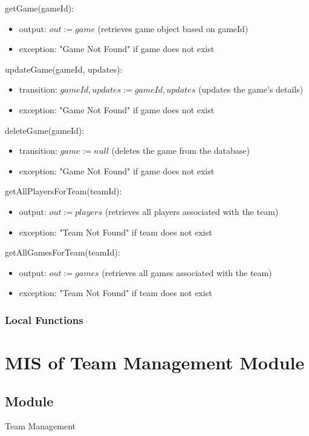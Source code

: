 \documentclass[12pt, titlepage]{article}
\begin{document}
\noindent getGame(gameId):
\begin{itemize}
\item output: $out := game$ (retrieves game object based on gameId)
\item exception: "Game Not Found" if game does not exist
\end{itemize}

\noindent updateGame(gameId, updates):
\begin{itemize}
\item transition: $gameId, updates := gameId, updates$ (updates the game's details)
\item exception: "Game Not Found" if game does not exist
\end{itemize}

\noindent deleteGame(gameId):
\begin{itemize}
\item transition: $game := null$ (deletes the game from the database)
\item exception: "Game Not Found" if game does not exist
\end{itemize}

\noindent getAllPlayersForTeam(teamId):
\begin{itemize}
\item output: $out := players$ (retrieves all players associated with the team)
\item exception: "Team Not Found" if team does not exist
\end{itemize}

\noindent getAllGamesForTeam(teamId):
\begin{itemize}
\item output: $out := games$ (retrieves all games associated with the team)
\item exception: "Team Not Found" if team does not exist
\end{itemize}

\subsubsection{Local Functions}

\section{MIS of Team Management Module} \label{TeamManagementModule}

\subsection{Module}
Team Management
\end{document}
